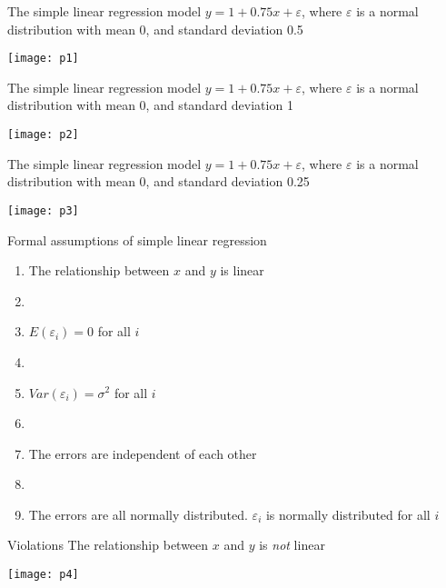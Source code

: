 \documentclass[xcolor=dvipsnames]{beamer}
\begin{document}
\begin{frame}{The simple linear regression model}
	$y = 1 + 0.75x + \varepsilon$, where $\varepsilon$ is a normal distribution with mean 0, and standard deviation 0.5
	\begin{center}
		\texttt{[image: p1]}
	\end{center}
\end{frame}

\begin{frame}{The simple linear regression model}
$y = 1 + 0.75x + \varepsilon$, where $\varepsilon$ is a normal distribution with mean 0, and standard deviation 1
\begin{center}
	\texttt{[image: p2]}
\end{center}
\end{frame}

\begin{frame}{The simple linear regression model}
$y = 1 + 0.75x + \varepsilon$, where $\varepsilon$ is a normal distribution with mean 0, and standard deviation 0.25
\begin{center}
	\texttt{[image: p3]}
\end{center}
\end{frame}

\begin{frame}{Formal assumptions of simple linear regression}
	\begin{enumerate}
		\item The relationship between $x$ and $y$ is linear
		\item[]
		\item $E(\varepsilon_i) = 0$ for all $i$
		\item[]
		\item $Var(\varepsilon_i) = \sigma^2$ for all $i$
		\item[]
		\item The errors are independent of each other
		\item[]
		\item The errors are all normally distributed. $\varepsilon_i$ is normally distributed for all $i$
	\end{enumerate}
\end{frame}

\begin{frame}{Violations}
The relationship between $x$ and $y$ is \emph{not} linear
\begin{center}
	\texttt{[image: p4]}
\end{center}
\end{frame}
\end{document}
